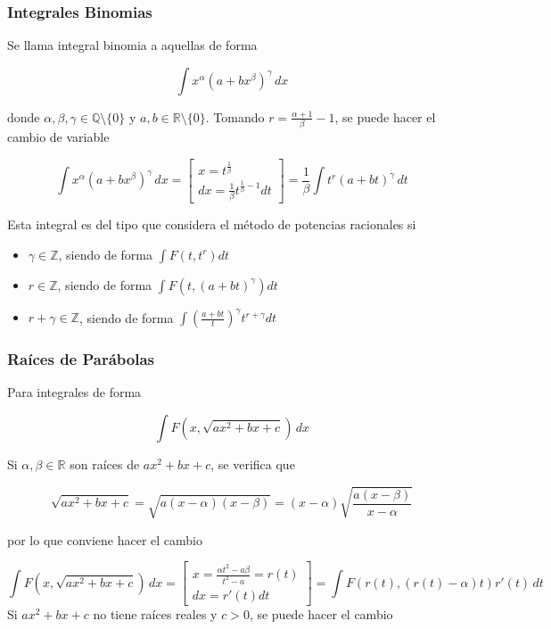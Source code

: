 \subsubsection{Integrales Binomias}

Se llama integral binomia a aquellas de forma

\[\int x^\alpha(a+bx^\beta)^\gamma\,dx\]

donde $\alpha, \beta, \gamma \in \mathbb{Q}\setminus\{0\}$ y $a, b\in\mathbb{R}\setminus\{0\}$. Tomando $r = \frac{\alpha+1}{\beta}-1$, se puede hacer el cambio de variable

\[\int x^\alpha(a+bx^\beta)^\gamma\,dx =
\begin{bmatrix}
x = t^\frac{1}{\beta}\\
dx=\frac{1}{\beta}t^{\frac{1}{\beta}-1}dt
\end{bmatrix}
= \frac{1}{\beta}\int t^r(a+bt)^\gamma\,dt\]

Esta integral es del tipo que considera el método de potencias racionales si 

\begin{itemize}
    \item $\gamma\in\mathbb{Z}$, siendo de forma $\int F(t, t^r)dt$
    \item $r\in\mathbb{Z}$, siendo de forma $\int F(t, (a+bt)^\gamma)dt$
    \item $r+\gamma\in\mathbb{Z}$, siendo de forma $\int \left(\frac{a+bt}{t}\right)^\gamma t^{r+\gamma}dt$
\end{itemize}

\subsubsection{Raíces de Parábolas}

Para integrales de forma

\[\int F(x, \sqrt{ax^2+bx+c})\, dx\]

Si $\alpha, \beta\in\mathbb{R}$ son raíces de $ax^2+bx+c$, se verifica que

\[\sqrt{ax^2+bx+c}=\sqrt{a(x-\alpha)(x-\beta)} =
(x-\alpha)\sqrt{\frac{a(x-\beta)}{x-\alpha}}\]

por lo que conviene hacer el cambio

\begin{equation}
\int F(x,\sqrt{ax^2+bx+c})\,dx =
\begin{bmatrix}
x = \frac{\alpha t^2-a\beta}{t^2-a} = r(t)\\
dx = r'(t)dt
\end{bmatrix} =
\int F(r(t),(r(t)-\alpha)t)r'(t)\,dt
\nonumber
\end{equation}
\bigbreak
\bigbreak
Si $ax^2+bx+c$ no tiene raíces reales y $c>0$, se puede hacer el cambio

